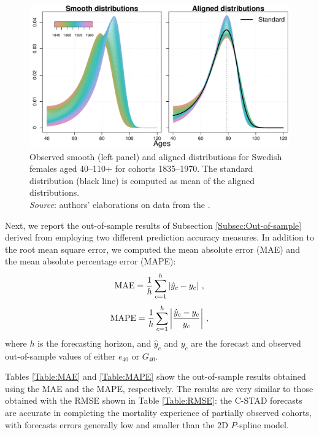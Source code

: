 \documentclass[11pt, a4paper]{article}
\begin{document}
\begin{figure}[t]
	\begin{center}
		\includegraphics[scale=0.57]{./Figures/FA0.pdf}
		\caption{{\color{red}Observed smooth (left panel) and aligned distributions for Swedish females aged 40--110+ for cohorts 1835--1970. The standard distribution (black line) is computed as mean of the aligned distributions. \\ \small \textit{Source}: authors' elaborations on data from the \cite{HMD}.}}\label{Fig:Alignment}	
	\end{center}
\end{figure}

{\color{red}Next,} we report the out-of-sample results of Subsection \ref{Subsec:Out-of-sample} derived from employing two different prediction accuracy measures. In addition to the root mean square error, we computed the mean absolute error (MAE) and the mean absolute percentage error (MAPE):
%
\begin{equation}\label{Eq:MAE}
\mathrm{MAE} = \frac{1}{h} \sum_{c=1}^{h} \left| \hat{y}_c - y_c \right|  \, , \notag 
\end{equation} 
%
\begin{equation}\label{Eq:MAPE}
\mathrm{MAPE}= \frac{1}{h}  \sum_{c=1}^{h} \left| \frac{\hat{y}_c - y_c}{y_c}  \right| \, , \notag
\end{equation} 
%
where $h$ is the forecasting horizon, and $\hat{y}_c$ and $y_c$ are the forecast and observed out-of-sample values of either $e_{40}$ or $G_{40}$. 

Tables \ref{Table:MAE} and \ref{Table:MAPE} show the out-of-sample results obtained using the MAE and the MAPE, respectively. The results are very similar to those obtained with the RMSE shown in Table \ref{Table:RMSE}: the C-STAD forecasts are accurate in completing the mortality experience of partially observed cohorts, with forecasts errors generally low and smaller than the 2D $P$-spline model.
  
\end{document}

